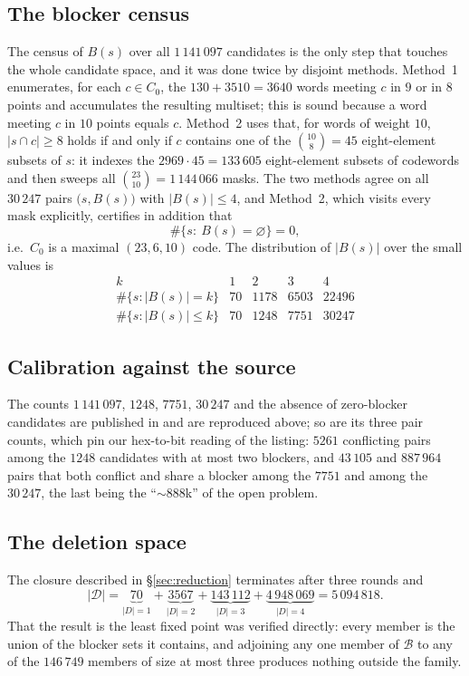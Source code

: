 \documentclass[11pt]{amsart}
\theoremstyle{remark}
\begin{document}
\subsection*{The blocker census}
The census of $B(s)$ over all $1\,141\,097$ candidates is the only step that touches the
whole candidate space, and it was done twice by disjoint methods. Method~1 enumerates, for each
$c\in C_0$, the $130+3510=3640$ words meeting $c$ in $9$ or in $8$ points and accumulates the
resulting multiset; this is sound because a word meeting $c$ in $10$ points equals $c$.
Method~2 uses that, for words of weight $10$, $|s\cap c|\ge 8$ holds if and only if $c$
contains one of the $\binom{10}{8}=45$ eight-element subsets of $s$: it indexes the
$2969\cdot45=133\,605$ eight-element subsets of codewords and then sweeps all
$\binom{23}{10}=1\,144\,066$ masks. The two methods agree on all $30\,247$ pairs
$\bigl(s,B(s)\bigr)$ with $|B(s)|\le4$, and Method~2, which visits every mask explicitly,
certifies in addition that
\[
 \#\{s:\ B(s)=\varnothing\}=0,
\]
i.e.\ $C_0$ is a maximal $(23,6,10)$ code. The distribution of $|B(s)|$ over the small values
is
\[
\begin{array}{r|rrrr}
 k & 1 & 2 & 3 & 4\\\hline
 \#\{s:|B(s)|=k\} & 70 & 1178 & 6503 & 22496\\
 \#\{s:|B(s)|\le k\} & 70 & 1248 & 7751 & 30247
\end{array}
\]

\subsection*{Calibration against the source}
The counts $1\,141\,097$, $1248$, $7751$, $30\,247$ and the absence of zero-blocker candidates
are published in \cite{Lys} and are reproduced above; so are its three pair counts, which pin
our hex-to-bit reading of the listing: $5261$ conflicting pairs among the $1248$ candidates
with at most two blockers, and $43\,105$ and $887\,964$ pairs that both conflict and share a
blocker among the $7751$ and among the $30\,247$, the last being the ``${\sim}888$k'' of the
open problem.

\subsection*{The deletion space}
The closure described in \S\ref{sec:reduction} terminates after three rounds and
\[
 |\mathcal D|=\underbrace{70}_{|D|=1}+\underbrace{3567}_{|D|=2}
 +\underbrace{143\,112}_{|D|=3}+\underbrace{4\,948\,069}_{|D|=4}=5\,094\,818 .
\]
That the result is the least fixed point was verified directly: every member is the union of
the blocker sets it contains, and adjoining any one member of $\mathcal B$ to any of the
$146\,749$ members of size at most three produces nothing outside the family.
\end{document}
